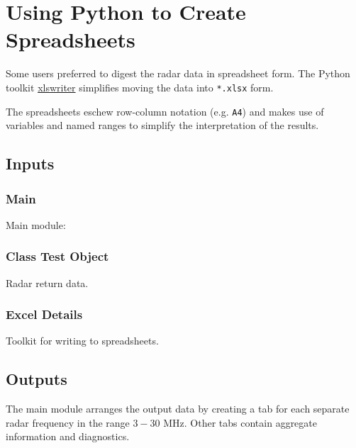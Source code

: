 % 

\section{Using Python to Create Spreadsheets}

Some users preferred to digest the radar data in spreadsheet form. The Python toolkit \href{https://pypi.org/project/XlsxWriter/}{xlswriter} simplifies moving the data into \texttt{*.xlsx} form.

The spreadsheets eschew row-column notation (e.g. \texttt{A4}) and makes use of variables and named ranges to simplify the interpretation of the results.

\subsection{Inputs}

\subsubsection{Main}
Main module: 
		

\subsubsection{Class Test Object}	
Radar return data.
		

\subsubsection{Excel Details}	
Toolkit for writing to spreadsheets.
		

\subsection{Outputs}
The main module arranges the output data by creating a tab for each separate radar frequency in the range $3-30$ MHz. Other tabs contain aggregate information and diagnostics.
		

\endinput  %
